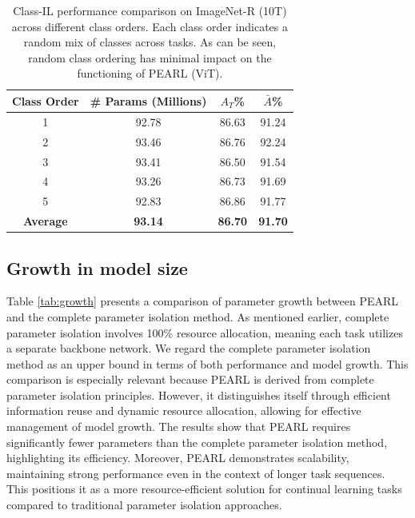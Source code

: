 \documentclass[10pt]{article} %
\begin{document}
\begin{table}[h]
    \centering

    \caption{Class-IL performance comparison on ImageNet-R (10T) across different class orders.  Each class order indicates a random mix of classes across tasks. As can be seen, random class ordering has minimal impact on the functioning of PEARL (ViT).  }
    \begin{tabular}{c|c|c|c}
        \toprule
        \textbf{Class Order} & \# Params (Millions) & $A_T$\% & $\bar{A}$\% \\
        \midrule
        1 & 92.78  & 86.63 & 91.24 \\
        2 & 93.46 & 86.76 & 92.24 \\
        3 & 93.41 & 86.50 & 91.54 \\
        4 & 93.26  & 86.73 & 91.69 \\
        5 & 92.83 & 86.86 & 91.77 \\
        \midrule
        \textbf{Average} &  \textbf{93.14} & \textbf{86.70} & \textbf{91.70} \\
        \bottomrule
    \end{tabular}
    \label{tab:class_order}

\end{table}

\subsection{Growth in model size}

Table \ref{tab:growth} presents a comparison of parameter growth between PEARL and the complete parameter isolation method. As mentioned earlier, complete parameter isolation involves 100\% resource allocation, meaning each task utilizes a separate backbone network. We regard the complete parameter isolation method as an upper bound in terms of both performance and model growth. This comparison is especially relevant because PEARL is derived from complete parameter isolation principles. However, it distinguishes itself through efficient information reuse and dynamic resource allocation, allowing for effective management of model growth. The results show that PEARL requires significantly fewer parameters than the complete parameter isolation method, highlighting its efficiency. Moreover, PEARL demonstrates scalability, maintaining strong performance even in the context of longer task sequences. This positions it as a more resource-efficient solution for continual learning tasks compared to traditional parameter isolation approaches.
\end{document}
